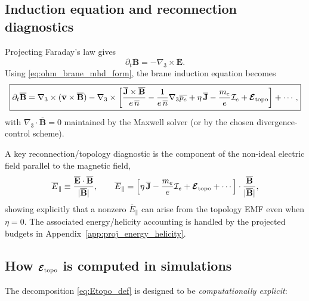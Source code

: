 \documentclass[11pt]{article}
\newcommand{\gradthree}{\nabla_3}
\begin{document}
\subsection{Induction equation and reconnection diagnostics}
\label{subsec:induction_topo}

Projecting Faraday's law gives
\begin{equation}
\partial_t\overline{\mathbf{B}} = -\gradthree\times \overline{\mathbf{E}}.
\end{equation}
Using \eqref{eq:ohm_brane_mhd_form}, the brane induction equation becomes
\begin{equation}
\boxed{
\partial_t\overline{\mathbf{B}}
=
\gradthree\times(\overline{\mathbf{v}}\times\overline{\mathbf{B}})
-\gradthree\times\left[
\frac{\overline{\mathbf{J}}\times\overline{\mathbf{B}}}{e\,\overline{n}}
-\frac{1}{e\,\overline{n}}\gradthree\overline{p_e}
+\eta\,\overline{\mathbf{J}}
-\frac{m_e}{e}\mathcal{I}_e
+\boldsymbol{\mathcal{E}}_{\rm topo}
\right]
+\cdots,
}
\label{eq:induction_with_topo}
\end{equation}
with \(\gradthree\cdot\overline{\mathbf{B}}=0\) maintained by the Maxwell solver (or by the chosen divergence-control scheme).

A key reconnection/topology diagnostic is the component of the non-ideal electric field parallel to the magnetic field,
\begin{equation}
\overline{E}_\parallel
\equiv
\frac{\overline{\mathbf{E}}\cdot\overline{\mathbf{B}}}{|\overline{\mathbf{B}}|},
\qquad
\overline{E}_\parallel
=
\left[
\eta\,\overline{\mathbf{J}}
-\frac{m_e}{e}\mathcal{I}_e
+\boldsymbol{\mathcal{E}}_{\rm topo}
+\cdots
\right]\cdot\frac{\overline{\mathbf{B}}}{|\overline{\mathbf{B}}|},
\label{eq:Eparallel_diag}
\end{equation}
showing explicitly that a nonzero \(\overline{E}_\parallel\) can arise from the topology EMF even when \(\eta=0\).
The associated energy/helicity accounting is handled by the projected budgets in Appendix~\ref{app:proj_energy_helicity}.

\subsection{How \texorpdfstring{$\boldsymbol{\mathcal{E}}_{\rm topo}$}{E_topo} is computed in simulations}
\label{subsec:etopocompute}

The decomposition \eqref{eq:Etopo_def} is designed to be \emph{computationally explicit}:
\end{document}

